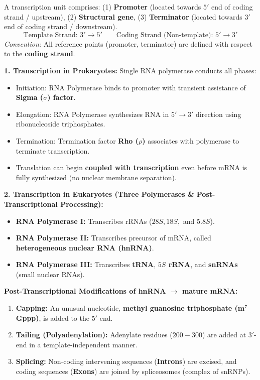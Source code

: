 \documentclass[10pt,a4paper]{article}
\begin{document}
\begin{conceptbox}
A transcription unit comprises: (1) \textbf{Promoter} (located towards $5'$ end of coding strand / upstream), (2) \textbf{Structural gene}, (3) \textbf{Terminator} (located towards $3'$ end of coding strand / downstream).
\begin{equation}
  \text{Template Strand: } 3' \longrightarrow 5' \qquad \text{Coding Strand (Non-template): } 5' \longrightarrow 3'
\end{equation}
\textit{Convention:} All reference points (promoter, terminator) are defined with respect to the \textbf{coding strand}.

\textbf{1. Transcription in Prokaryotes:}
Single RNA polymerase conducts all phases:
\begin{itemize}
  \item Initiation: RNA Polymerase binds to promoter with transient assistance of \textbf{Sigma ($\sigma$) factor}.
  \item Elongation: RNA Polymerase synthesizes RNA in $5'\to 3'$ direction using ribonucleoside triphosphates.
  \item Termination: Termination factor \textbf{Rho ($\rho$)} associates with polymerase to terminate transcription.
  \item Translation can begin \textbf{coupled with transcription} even before mRNA is fully synthesized (no nuclear membrane separation).
\end{itemize}

\textbf{2. Transcription in Eukaryotes (Three Polymerases \& Post-Transcriptional Processing):}
\begin{itemize}
  \item \textbf{RNA Polymerase I:} Transcribes rRNAs ($28S, 18S,$ and $5.8S$).
  \item \textbf{RNA Polymerase II:} Transcribes precursor of mRNA, called \textbf{heterogeneous nuclear RNA (hnRNA)}.
  \item \textbf{RNA Polymerase III:} Transcribes \textbf{tRNA}, \textbf{$5S$ rRNA}, and \textbf{snRNAs} (small nuclear RNAs).
\end{itemize}
\textbf{Post-Transcriptional Modifications of hnRNA $\to$ mature mRNA:}
\begin{enumerate}
  \item \textbf{Capping:} An unusual nucleotide, \textbf{methyl guanosine triphosphate (m$^7$Gppp)}, is added to the $5'$-end.
  \item \textbf{Tailing (Polyadenylation):} Adenylate residues ($200-300$) are added at $3'$-end in a template-independent manner.
  \item \textbf{Splicing:} Non-coding intervening sequences (\textbf{Introns}) are excised, and coding sequences (\textbf{Exons}) are joined by spliceosomes (complex of snRNPs).
\end{enumerate}
\end{conceptbox}
\end{document}
